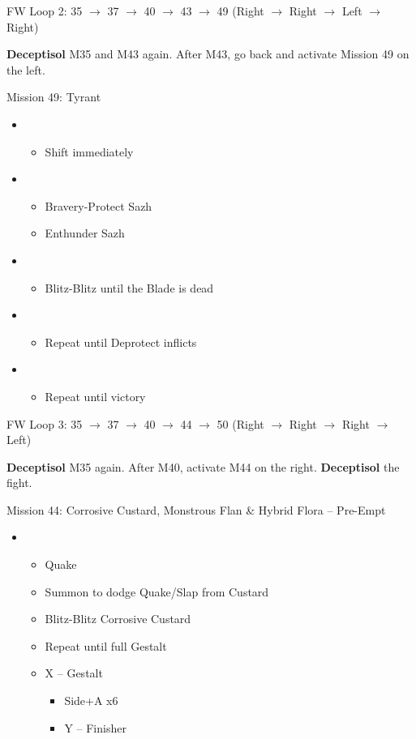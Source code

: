 FW Loop 2: 35 $\rightarrow$ 37 $\rightarrow$ 40 $\rightarrow$ 43 $\rightarrow$ 49 (Right $\rightarrow$ Right $\rightarrow$ Left $\rightarrow$ Right)

\textbf{Deceptisol} M35 and M43 again.
After M43, go back and activate Mission 49 on the left.

\begin{battle}{Mission 49: Tyrant}
	\begin{itemize}
		\item \second
			\begin{itemize}
				\item Shift immediately
			\end{itemize}
		\item \third
			\begin{itemize}
				\item Bravery-Protect Sazh
				\item Enthunder Sazh
			\end{itemize}
		\item \fifth
			\begin{itemize}
				\item Blitz-Blitz until the Blade is dead
			\end{itemize}
		\item \second
			\begin{itemize}
				\item Repeat until Deprotect inflicts
			\end{itemize}
		\item \first
			\begin{itemize}
				\item Repeat until victory
			\end{itemize}												
	\end{itemize}
\end{battle}

FW Loop 3: 35 $\rightarrow$ 37 $\rightarrow$ 40 $\rightarrow$ 44 $\rightarrow$ 50 (Right $\rightarrow$ Right $\rightarrow$ Right $\rightarrow$ Left)

\textbf{Deceptisol} M35 again.
After M40, activate M44 on the right.
\textbf{Deceptisol} the fight.

\begin{battle}{{Mission 44: Corrosive Custard, Monstrous Flan \& Hybrid Flora -- Pre-Empt}}
	\begin{itemize}
		\item \second
			\begin{itemize}
				\item Quake
				\item Summon to dodge Quake/Slap from Custard
				\item Blitz-Blitz Corrosive Custard
				\item Repeat until full Gestalt
				\item X -- Gestalt
					\begin{itemize}
						\item Side+A x6
						\item Y -- Finisher
					\end{itemize}
			\end{itemize}												
	\end{itemize}
\end{battle}

